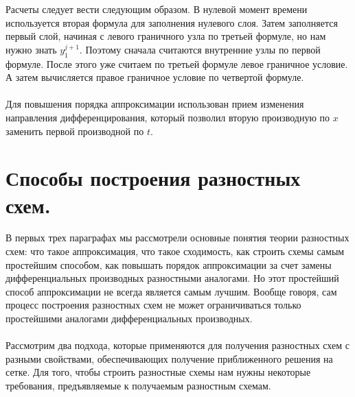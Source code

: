 \documentclass[a4paper, 12pt]{report}
\numberwithin{equation}{section}
\begin{document}
Расчеты следует вести следующим образом. В нулевой момент времени используется вторая формула для заполнения нулевого слоя. Затем заполняется первый слой, начиная с левого граничного узла по третьей формуле, но нам нужно знать $y_1^{j+1}$. Поэтому сначала считаются внутренние узлы по первой формуле. После этого уже считаем по третьей формуле левое граничное условие. А затем вычисляется правое граничное условие по четвертой формуле.\\\\
Для повышения порядка аппроксимации использован прием изменения направления дифференцирования, который позволил вторую производную по $x$ заменить первой производной по $t$.
\section{Способы построения разностных схем.}
В первых трех параграфах мы рассмотрели основные понятия теории разностных схем: что такое аппроксимация, что такое сходимость, как строить схемы самым простейшим способом, как повышать порядок аппроксимации за счет замены дифференциальных производных разностными аналогами. Но этот простейший способ аппроксимации не всегда является самым лучшим. Вообще говоря, сам процесс построения разностных схем не может ограничиваться только простейшими аналогами дифференциальных производных.\\\\
Рассмотрим два подхода, которые применяются для получения разностных схем с разными свойствами, обеспечивающих получение приближенного решения на сетке. Для того, чтобы строить разностные схемы нам нужны некоторые требования, предъявляемые к получаемым разностным схемам.
\end{document}
